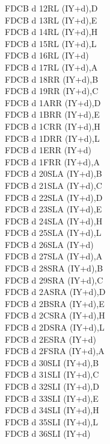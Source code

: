 \begin{multicols}{3}
{\begin{tabbing}
	FDCB d 12\>RL (IY+d),D\UNDOC\\
	FDCB d 13\>RL (IY+d),E\UNDOC\\
	FDCB d 14\>RL (IY+d),H\UNDOC\\
	FDCB d 15\>RL (IY+d),L\UNDOC\\
	FDCB d 16\>RL (IY+d)\\
	FDCB d 17\>RL (IY+d),A\UNDOC\\
	FDCB d 18\>RR (IY+d),B\UNDOC\\
	FDCB d 19\>RR (IY+d),C\UNDOC\\
	FDCB d 1A\>RR (IY+d),D\UNDOC\\
	FDCB d 1B\>RR (IY+d),E\UNDOC\\
	FDCB d 1C\>RR (IY+d),H\UNDOC\\
	FDCB d 1D\>RR (IY+d),L\UNDOC\\
	FDCB d 1E\>RR (IY+d)\\
	FDCB d 1F\>RR (IY+d),A\UNDOC\\
	FDCB d 20\>SLA (IY+d),B\UNDOC\\
	FDCB d 21\>SLA (IY+d),C\UNDOC\\
	FDCB d 22\>SLA (IY+d),D\UNDOC\\
	FDCB d 23\>SLA (IY+d),E\UNDOC\\
	FDCB d 24\>SLA (IY+d),H\UNDOC\\
	FDCB d 25\>SLA (IY+d),L\UNDOC\\
	FDCB d 26\>SLA (IY+d)\\
	FDCB d 27\>SLA (IY+d),A\UNDOC\\
	FDCB d 28\>SRA (IY+d),B\UNDOC\\
	FDCB d 29\>SRA (IY+d),C\UNDOC\\
	FDCB d 2A\>SRA (IY+d),D\UNDOC\\
	FDCB d 2B\>SRA (IY+d),E\UNDOC\\
	FDCB d 2C\>SRA (IY+d),H\UNDOC\\
	FDCB d 2D\>SRA (IY+d),L\UNDOC\\
	FDCB d 2E\>SRA (IY+d)\\
	FDCB d 2F\>SRA (IY+d),A\UNDOC\\
	FDCB d 30\>SLI (IY+d),B\UNDOC\\
	FDCB d 31\>SLI (IY+d),C\UNDOC\\
	FDCB d 32\>SLI (IY+d),D\UNDOC\\
	FDCB d 33\>SLI (IY+d),E\UNDOC\\
	FDCB d 34\>SLI (IY+d),H\UNDOC\\
	FDCB d 35\>SLI (IY+d),L\UNDOC\\
	FDCB d 36\>SLI (IY+d)\UNDOC\\

\end{tabbing}}
\end{multicols}
